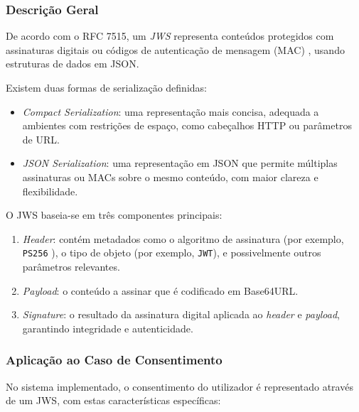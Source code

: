 \subsubsection{Descrição Geral}

De acordo com o RFC 7515, um \textit{JWS} representa conteúdos protegidos com assinaturas digitais ou códigos de autenticação de mensagem (MAC) \citep{NISTMAC}, usando estruturas de dados em JSON.

Existem duas formas de serialização definidas:

\begin{itemize}
  \item \textit{Compact Serialization}: uma representação mais concisa, adequada a ambientes com restrições de espaço, como cabeçalhos HTTP ou parâmetros de URL.
  \item \textit{JSON Serialization}: uma representação em JSON que permite múltiplas assinaturas ou MACs sobre o mesmo conteúdo, com maior clareza e flexibilidade.
\end{itemize}

O JWS baseia-se em três componentes principais:

\begin{enumerate}
  \item \textit{Header}: contém metadados como o algoritmo de assinatura (por exemplo, \texttt{PS256} \citep{Auth0SigningAlgorithms}
), o tipo de objeto (por exemplo, \texttt{JWT}), e possivelmente outros parâmetros relevantes.
  \item \textit{Payload}: o conteúdo a assinar que é codificado em Base64URL.
  \item \textit{Signature}: o resultado da assinatura digital aplicada ao \textit{header} e \textit{payload}, garantindo integridade e autenticidade.
\end{enumerate}

\subsubsection{Aplicação ao Caso de Consentimento}

No sistema implementado, o consentimento do utilizador é representado através de um JWS, com estas características específicas:

